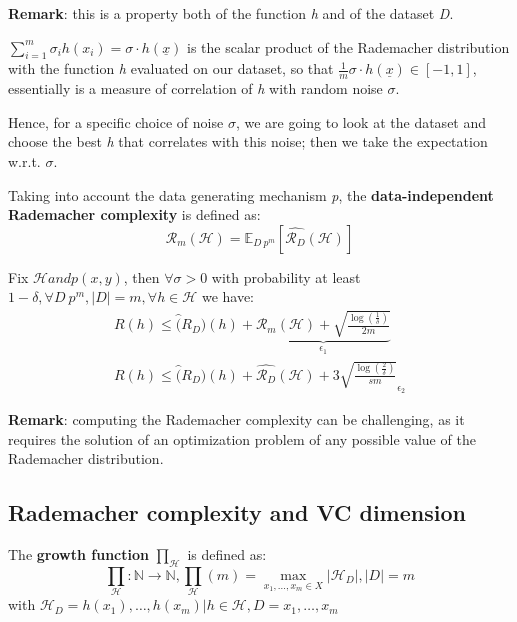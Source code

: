 \textbf{Remark}: this is a property both of the function \textit{h} and of the dataset \textit{D}.

\begin{observationblock}
$\sum_{i=1}^{m}\sigma_i h(x_i) = \sigma \cdot h(\underline{x})$ is the scalar product of the Rademacher distribution \sigma with the function \textit{h} evaluated on our dataset, so that $\frac{1}{m}\sigma \cdot h(\underline{x}) \in [-1,1]$, essentially is a measure of correlation of \textit{h} with random noise $\sigma$.
\end{observationblock}

Hence, for a specific choice of noise $\sigma$, we are going to look at the dataset and choose the best \textit{h} that correlates with this noise; then we take the expectation w.r.t. $\sigma$. 

\begin{definitionblock}
    Taking into account the data generating mechanism \textit{p}, the \textbf{data-independent Rademacher complexity} is defined as:
    $$
    \mathcal{R}_m(\mathcal{H}) = \mathbb{E}_{D~p^m}[\hat{\mathcal{R}_D}(\mathcal{H})]
    $$
\end{definitionblock}

Fix $\mathcal{H} and p(x,y)$, then $\forall \sigma > 0$ with probability at least $1-\delta, \forall D ~ p^m, |D| = m, \forall h \in \mathcal{H}$ we have:
$$
\begin{array}{rl}
    R(h) \leq \hat(R_D)(h) + \underbrace{\mathcal{R}_m(\mathcal{H}) + \sqrt{\frac{\log (\frac{1}{\delta})}{2m}}}_{\epsilon_1}\\
    R(h) \leq \hat(R_D)(h) + \hat{\mathcal{R}_D}(\mathcal{H}) + 3\sqrt{\frac{\log (\frac{2}{\delta})}{sm}}_{\epsilon_2}
\end{array}
$$

\textbf{Remark}: computing the Rademacher complexity can be challenging, as it requires the solution of an optimization problem of any possible value of the Rademacher distribution. 

\subsection{Rademacher complexity and VC dimension}

\begin{definitionblock}
    The \textbf{growth function} $\prod_{\mathcal{H}}$ is defined as:
    $$
    \prod_{\mathcal{H}} : \mathbb{N} \to \mathbb{N}, \prod_{\mathcal{H}}(m) = \max_{x_1,\dots,x_m \in X} |{\mathcal{H}_D}|, |D| = m
    $$
    with $\mathcal{H}_D = {h(x_1),\dots,h(x_m)|h \in \mathcal{H}, D = {x_1,\dots,x_m}}$
\end{definitionblock}

